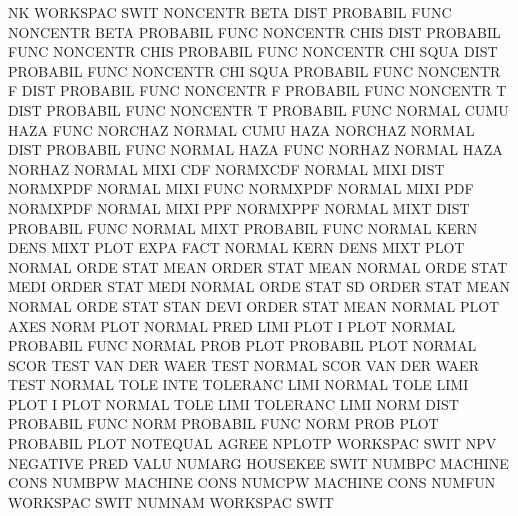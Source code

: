 NK                                      WORKSPAC SWIT
NONCENTR BETA DIST                      PROBABIL FUNC
NONCENTR BETA                           PROBABIL FUNC
NONCENTR CHIS DIST                      PROBABIL FUNC
NONCENTR CHIS                           PROBABIL FUNC
NONCENTR CHI  SQUA DIST                 PROBABIL FUNC
NONCENTR CHI  SQUA                      PROBABIL FUNC
NONCENTR F    DIST                      PROBABIL FUNC
NONCENTR F                              PROBABIL FUNC
NONCENTR T    DIST                      PROBABIL FUNC
NONCENTR T                              PROBABIL FUNC
NORMAL   CUMU HAZA FUNC                 NORCHAZ
NORMAL   CUMU HAZA                      NORCHAZ
NORMAL   DIST                           PROBABIL FUNC
NORMAL   HAZA FUNC                      NORHAZ
NORMAL   HAZA                           NORHAZ
NORMAL   MIXI CDF                       NORMXCDF
NORMAL   MIXI DIST                      NORMXPDF
NORMAL   MIXI FUNC                      NORMXPDF
NORMAL   MIXI PDF                       NORMXPDF
NORMAL   MIXI PPF                       NORMXPPF
NORMAL   MIXT DIST                      PROBABIL FUNC
NORMAL   MIXT                           PROBABIL FUNC
NORMAL   KERN DENS MIXT PLOT EXPA FACT  NORMAL   KERN DENS MIXT PLOT
NORMAL   ORDE STAT MEAN                 ORDER    STAT MEAN
NORMAL   ORDE STAT MEDI                 ORDER    STAT MEDI
NORMAL   ORDE STAT SD                   ORDER    STAT MEAN
NORMAL   ORDE STAT STAN DEVI            ORDER    STAT MEAN
NORMAL   PLOT AXES                      NORM     PLOT
NORMAL   PRED LIMI PLOT                 I        PLOT
NORMAL                                  PROBABIL FUNC
NORMAL   PROB PLOT                      PROBABIL PLOT
NORMAL   SCOR TEST                      VAN      DER  WAER TEST
NORMAL   SCOR                           VAN      DER  WAER TEST
NORMAL   TOLE INTE                      TOLERANC LIMI
NORMAL   TOLE LIMI PLOT                 I        PLOT
NORMAL   TOLE LIMI                      TOLERANC LIMI
NORM     DIST                           PROBABIL FUNC
NORM                                    PROBABIL FUNC
NORM     PROB PLOT                      PROBABIL PLOT
NOTEQUAL                                AGREE
NPLOTP                                  WORKSPAC SWIT
NPV                                     NEGATIVE PRED VALU
NUMARG                                  HOUSEKEE SWIT
NUMBPC                                  MACHINE  CONS
NUMBPW                                  MACHINE  CONS
NUMCPW                                  MACHINE  CONS
NUMFUN                                  WORKSPAC SWIT
NUMNAM                                  WORKSPAC SWIT
